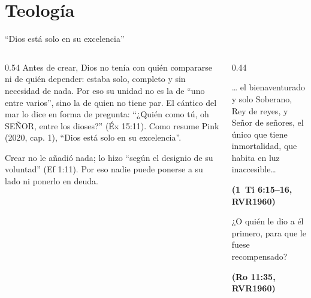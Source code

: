 \documentclass[hyperref={bookmarks=false},aspectratio=169]{beamer}
\newcommand{\SENOR}{S{\fontsize{0.78em}{1em}\selectfont EÑOR}}
\newcommand{\fuente}[1]{\par\hfill{\upshape\bfseries\footnotesize\textcolor{azul}{#1}}}
\begin{document}
\section{Teología}

\begin{frame}{``Dios está solo en su excelencia''}
\begin{columns}[t,onlytextwidth]
\begin{column}{0.54\textwidth}\small
Antes de crear, Dios no tenía con quién compararse ni de quién depender: estaba solo, completo y sin necesidad de nada. Por eso su unidad no es la de ``uno entre varios'', sino la de quien no tiene par. El cántico del mar lo dice en forma de pregunta: ``¿Quién como tú, oh \SENOR, entre los dioses?'' (Éx 15:11). Como resume Pink (2020, cap. 1), ``Dios está solo en su excelencia''.\par\smallskip
Crear no le añadió nada; lo hizo ``según el designio de su voluntad'' (Ef 1:11). Por eso nadie puede ponerse a su lado ni ponerlo en deuda.
\end{column}
\begin{column}{0.44\textwidth}
\begin{cita}[fontupper=\scriptsize\itshape]\ldots{} el bienaventurado y solo Soberano, Rey de reyes, y Señor de señores, el único que tiene inmortalidad, que habita en luz inaccesible\ldots\fuente{(1~Ti 6:15--16, RVR1960)}\end{cita}
\begin{cita}[fontupper=\scriptsize\itshape]¿O quién le dio a él primero, para que le fuese recompensado?\fuente{(Ro 11:35, RVR1960)}\end{cita}
\end{column}
\end{columns}
\end{frame}
\end{document}
